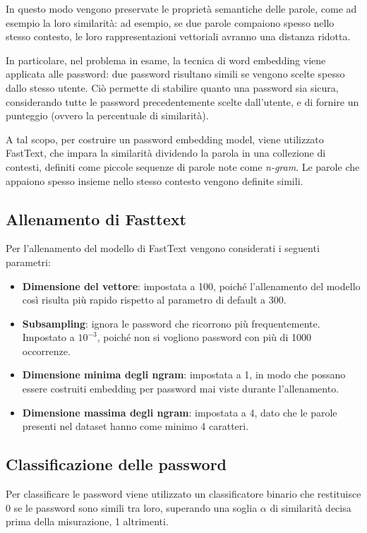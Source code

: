 In questo modo vengono preservate le proprietà semantiche delle parole, come ad esempio la loro similarità: ad esempio, se due parole compaiono spesso nello stesso contesto, le loro rappresentazioni vettoriali avranno una distanza ridotta.

In particolare, nel problema in esame, la tecnica di word embedding viene applicata alle password: due password risultano simili se vengono scelte spesso dallo stesso utente. Ciò permette di stabilire quanto una password sia sicura, considerando tutte le password precedentemente scelte dall'utente, e di fornire un punteggio (ovvero la percentuale di similarità).

A tal scopo, per costruire un password embedding model, viene utilizzato FastText, che impara la similarità dividendo la parola in una collezione di contesti, definiti come piccole sequenze di parole note come \emph{n-gram}. Le parole che appaiono spesso insieme nello stesso contesto vengono definite simili.

\subsection{Allenamento di Fasttext}
\label{sec:allenamento fasttext}
Per l'allenamento del modello di FastText vengono considerati i seguenti parametri:

\begin{itemize}
    \item \textbf{Dimensione del vettore}: impostata a 100, poiché l'allenamento del modello così risulta più rapido rispetto al parametro di default a 300.
    \item \textbf{Subsampling}: ignora le password che ricorrono più frequentemente. Impostato a $10^{-3}$, poiché non si vogliono password con più di 1000 occorrenze.
    \item \textbf{Dimensione minima degli ngram}: impostata a 1, in modo che possano essere costruiti embedding per password mai viste durante l'allenamento.
    \item \textbf{Dimensione massima degli ngram}: impostata a 4, dato che le parole presenti nel dataset hanno come minimo 4 caratteri.
\end{itemize}
\subsection{Classificazione delle password}
\label{sec:classificazione password}
Per classificare le password viene utilizzato un classificatore binario che restituisce 0 se le password sono simili tra loro, superando una soglia $\alpha$ di similarità decisa prima della misurazione, 1 altrimenti.

